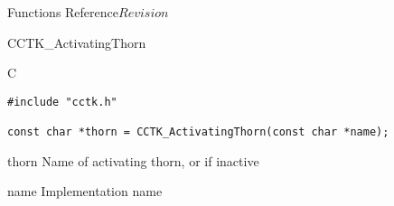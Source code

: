 \begin{cactuspart}{ Functions Reference}{}{$Revision$}
\begin{FunctionDescription}{CCTK\_ActivatingThorn}
\begin{SynopsisSection}
\begin{Synopsis}{C}
\begin{verbatim}
#include "cctk.h"

const char *thorn = CCTK_ActivatingThorn(const char *name);
\end{verbatim}
\end{Synopsis}
\end{SynopsisSection}

\begin{ResultSection}
\begin{Result}{thorn}
Name of activating thorn, or  if inactive
\end{Result}
\end{ResultSection}

\begin{ParameterSection}
\begin{Parameter}{name}
Implementation name
\end{Parameter}
\end{ParameterSection}


\end{FunctionDescription}
\end{cactuspart}
